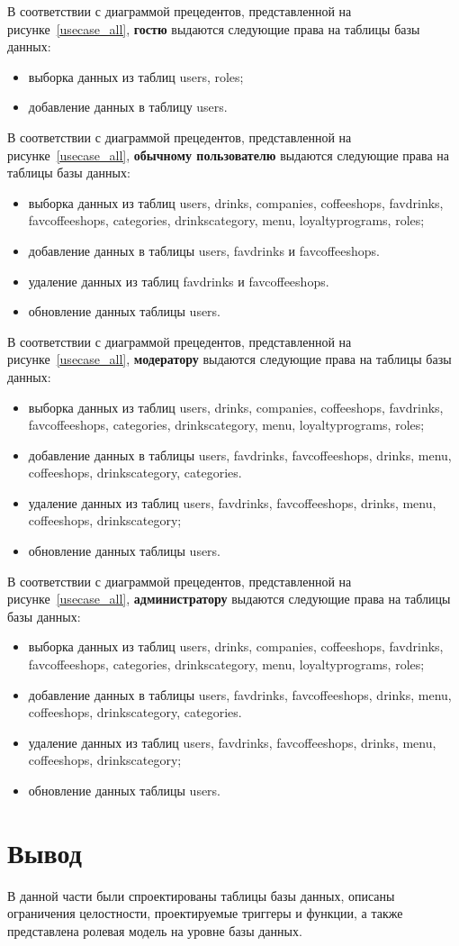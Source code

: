В соответствии с диаграммой прецедентов, представленной на рисунке~\ref{usecase_all}, \textbf{гостю} выдаются следующие права на таблицы базы данных:
\begin{itemize}
	\item выборка данных из таблиц users, roles;
	\item добавление данных в таблицу users.
\end{itemize}

В соответствии с диаграммой прецедентов, представленной на рисунке~\ref{usecase_all}, \textbf{обычному пользователю} выдаются следующие права на таблицы базы данных:
\begin{itemize}
	\item выборка данных из таблиц users, drinks, companies, coffeeshops, favdrinks, favcoffeeshops, categories, drinkscategory, menu, loyaltyprograms, roles;
	\item добавление данных в таблицы users, favdrinks и favcoffeeshops.
	\item удаление данных из таблиц favdrinks и favcoffeeshops.
	\item обновление данных таблицы users.
\end{itemize}

В соответствии с диаграммой прецедентов, представленной на рисунке~\ref{usecase_all}, \textbf{модератору} выдаются следующие права на таблицы базы данных:
\begin{itemize}
	\item выборка данных из таблиц users, drinks, companies, coffeeshops, favdrinks, favcoffeeshops, categories, drinkscategory, menu, loyaltyprograms, roles;
	\item добавление данных в таблицы users, favdrinks, favcoffeeshops, drinks, menu, coffeeshops, drinkscategory, categories.
		\item удаление данных из таблиц users, favdrinks, favcoffeeshops, drinks, menu, coffeeshops, drinkscategory;
		\item обновление данных таблицы users.
\end{itemize}

В соответствии с диаграммой прецедентов, представленной на рисунке~\ref{usecase_all}, \textbf{администратору} выдаются следующие права на таблицы базы данных:
\begin{itemize}
		\item выборка данных из таблиц users, drinks, companies, coffeeshops, favdrinks, favcoffeeshops, categories, drinkscategory, menu, loyaltyprograms, roles;
	\item добавление данных в таблицы users, favdrinks, favcoffeeshops, drinks, menu, coffeeshops, drinkscategory, categories.
	\item удаление данных из таблиц users, favdrinks, favcoffeeshops, drinks, menu, coffeeshops, drinkscategory;
		\item обновление данных таблицы users.
\end{itemize}




\section*{Вывод}
В данной части были спроектированы таблицы базы данных, описаны ограничения целостности, проектируемые триггеры и функции, а также представлена ролевая модель на уровне базы данных.